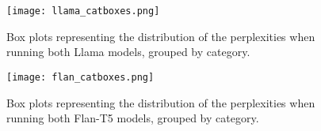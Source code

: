 \begin{figure}[p]
	\texttt{[image: llama\_catboxes.png]}
	\caption{Box plots representing the distribution of the perplexities when running both Llama models, grouped by category.}
\end{figure}

\begin{figure}[p]
	\texttt{[image: flan\_catboxes.png]}
	\caption{Box plots representing the distribution of the perplexities when running both Flan-T5 models, grouped by category.}
\end{figure}
